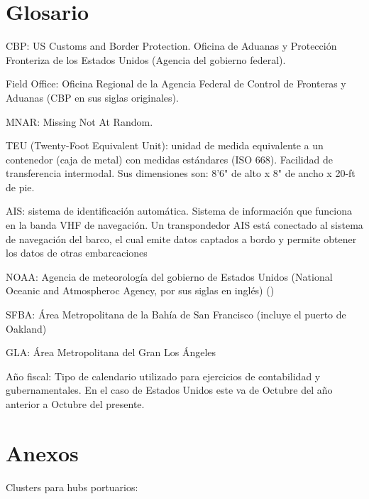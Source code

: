 \documentclass[12pt]{article}
\begin{document}
\section{Glosario}
\begin{description}
	\item CBP: US Customs and Border Protection. Oficina de Aduanas y Protección Fronteriza de los Estados Unidos (Agencia del gobierno federal).\cite{cbp_website}
	\item Field Office: Oficina Regional de la Agencia Federal de Control de Fronteras y Aduanas (CBP en sus siglas originales). \cite{cbp2025ports}
	\item MNAR: Missing Not At Random.
	\item TEU (Twenty-Foot Equivalent Unit): unidad de medida equivalente a un contenedor (caja de metal) con medidas estándares (ISO 668). Facilidad de transferencia intermodal. Sus dimensiones son: 8'6" de alto x 8" de ancho x 20-ft de pie.
	\item AIS: sistema de identificación automática. Sistema de información que funciona en la banda VHF de navegación. Un transpondedor AIS está conectado al sistema de navegación del barco, el cual emite datos captados a bordo y permite obtener los datos de otras embarcaciones \cite{nauticaprofesional2025ais} 
	\item NOAA: Agencia de meteorología del gobierno de Estados Unidos (National Oceanic and Atmospheroc Agency, por sus siglas en inglés) (\cite{NOAA_ScienceCouncil})
	\item SFBA: Área Metropolitana de la Bahía de San Francisco (incluye el puerto de Oakland)
	\item GLA: Área Metropolitana del Gran Los Ángeles
	\item Año fiscal: Tipo de calendario utilizado para ejercicios de contabilidad y gubernamentales. En el caso de Estados Unidos este va de Octubre del año anterior a Octubre del presente. \cite{federaltimes2022fiscalyear}
\end{description}

\newpage
\section{Anexos}
Clusters para hubs portuarios:
\end{document}
